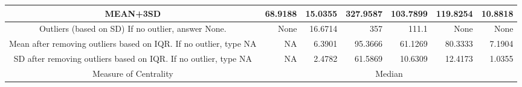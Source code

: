 \begin{table}[H]
\begin{adjustbox}{width = \textwidth, center}
\begin{tabular}{|c|rrrrrr|}
            MEAN+3SD                                                                     & \multicolumn{1}{r|}{68.9188}                                    & \multicolumn{1}{r|}{15.0355}                                                 & \multicolumn{1}{r|}{327.9587}                                                    & \multicolumn{1}{r|}{103.7899}                            & \multicolumn{1}{r|}{119.8254}                           & 10.8818                                                          \\ \hline
            \cellcolor[HTML]{D9D2E9}Outliers (based on SD)  If no outlier, answer None.  & \multicolumn{1}{r|}{None}                                       & \multicolumn{1}{r|}{16.6714}                                                 & \multicolumn{1}{r|}{357}                                                         & \multicolumn{1}{r|}{111.1}                               & \multicolumn{1}{r|}{None}                               & None                                                             \\ \hline
            Mean after removing outliers based on IQR. If no outlier, type NA            & \multicolumn{1}{r|}{NA}                                         & \multicolumn{1}{r|}{6.3901}                                                  & \multicolumn{1}{r|}{95.3666}                                                     & \multicolumn{1}{r|}{61.1269}                             & \multicolumn{1}{r|}{80.3333}                            & 7.1904                                                           \\ \hline
            SD after removing outliers based on IQR. If no outlier, type NA              & \multicolumn{1}{r|}{NA}                                         & \multicolumn{1}{r|}{2.4782}                                                  & \multicolumn{1}{r|}{61.5869}                                                     & \multicolumn{1}{r|}{10.6309}                             & \multicolumn{1}{r|}{12.4173}                            & 1.0355                                                           \\ \hline
            \rowcolor[HTML]{F4CCCC} 
            Measure of Centrality                                                        & \multicolumn{6}{c|}{\cellcolor[HTML]{F4CCCC}Median}                                                                                                                                                                                                                                                                                                                                                                       \\ \hline

\end{tabular}
\end{adjustbox}
\end{table}

